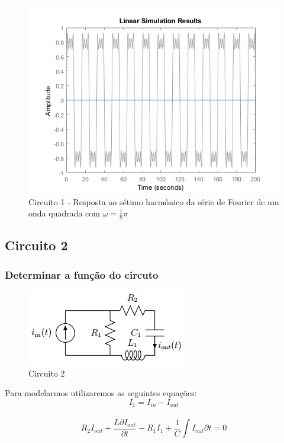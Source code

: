 \documentclass[a4paper, 12pt]{article}
\begin{document}
			\begin{figure}[!ht]
				\centering
				\includegraphics[scale=0.71]{img/1m_circ1.png}
				\caption{Circuito 1 - Resposta ao sétimo harmônico da série de Fourier de um onda quadrada com $\omega = \frac{1}{8}\pi$}	
			\end{figure}
		\newpage
		\subsection{Circuito 2}
			\subsubsection{Determinar a função do circuto}
			\begin{figure}[!hb]
				\centering
				\includegraphics{img/circuito2.png}
				\caption{Circuito 2}	
			\end{figure}			
			
			Para modelarmos utilizaremos as seguintes equações:
			\[				
				 I_{1} = I_{in} - I_{out}
			\] 	\\	
			\[	
				 R_{2}I_{out} + \frac{L \partial I_{out}}{\partial t} - R_{1}I_{1} + \frac{1}{C}\int I_{out}\partial t = 0
			\] 	\\	
			
\end{document}
